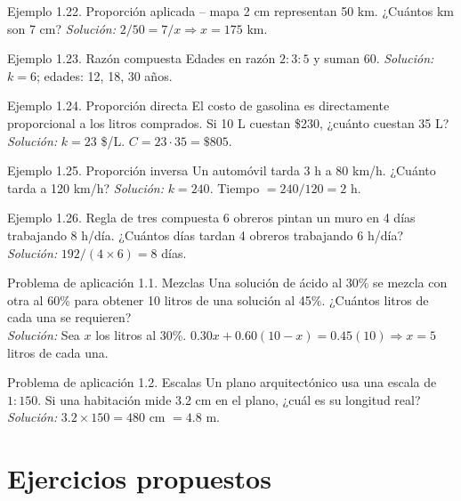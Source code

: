 \documentclass[12pt,letterpaper]{book}
\begin{document}
\begin{ejbox}{Ejemplo 1.22. Proporción aplicada -- mapa}
2 cm representan 50 km. ¿Cuántos km son 7 cm? \textit{Solución:} $2/50=7/x\Rightarrow x=175$ km.
\end{ejbox}

\begin{ejbox}{Ejemplo 1.23. Razón compuesta}
Edades en razón $2:3:5$ y suman 60. \textit{Solución:} $k=6$; edades: 12, 18, 30 años.
\end{ejbox}

\begin{ejbox}{Ejemplo 1.24. Proporción directa}
El costo de gasolina es directamente proporcional a los litros comprados. Si 10 L cuestan \$230, ¿cuánto cuestan 35 L? \textit{Solución:} $k=23$ \$/L. $C=23\cdot35=\$805$.
\end{ejbox}

\begin{ejbox}{Ejemplo 1.25. Proporción inversa}
Un automóvil tarda 3 h a 80 km/h. ¿Cuánto tarda a 120 km/h? \textit{Solución:} $k=240$. Tiempo $=240/120=2$ h.
\end{ejbox}

\begin{ejbox}{Ejemplo 1.26. Regla de tres compuesta}
6 obreros pintan un muro en 4 días trabajando 8 h/día. ¿Cuántos días tardan 4 obreros trabajando 6 h/día? \textit{Solución:} $192/(4\times6)=8$ días.
\end{ejbox}

\begin{aplbox}{Problema de aplicación 1.1. Mezclas}
Una solución de ácido al 30\% se mezcla con otra al 60\% para obtener 10 litros de una solución al 45\%. ¿Cuántos litros de cada una se requieren?\\
\textit{Solución:} Sea $x$ los litros al 30\%. $0.30x+0.60(10-x)=0.45(10)\Rightarrow x=5$ litros de cada una.
\end{aplbox}

\begin{aplbox}{Problema de aplicación 1.2. Escalas}
Un plano arquitectónico usa una escala de $1:150$. Si una habitación mide 3.2 cm en el plano, ¿cuál es su longitud real?\\
\textit{Solución:} $3.2\times150=480$ cm $=4.8$ m.
\end{aplbox}

\section{Ejercicios propuestos}
\end{document}
